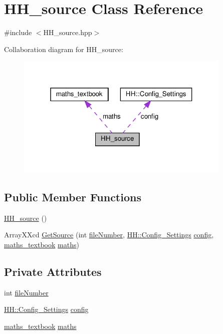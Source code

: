 \hypertarget{class_h_h__source}{}\section{H\+H\+\_\+source Class Reference}
\label{class_h_h__source}


{\ttfamily \#include $<$H\+H\+\_\+source.\+hpp$>$}



Collaboration diagram for H\+H\+\_\+source\+:\nopagebreak
\begin{figure}[H]
\begin{center}
\leavevmode
\includegraphics[width=292pt]{class_h_h__source__coll__graph}
\end{center}
\end{figure}
\subsection*{Public Member Functions}
\begin{DoxyCompactItemize}
\item 
\hyperlink{class_h_h__source_a0b3c052d274495b4f90fb09d15fff9fa}{H\+H\+\_\+source} ()
\item 
Array\+X\+Xcd \hyperlink{class_h_h__source_a059c934be1aaa0ed411fea5374bb2428}{Get\+Source} (int \hyperlink{class_h_h__source_a6631481cc1bea05ab564cb1841644a12}{file\+Number}, \hyperlink{class_h_h_1_1_config___settings}{H\+H\+::\+Config\+\_\+\+Settings} \hyperlink{class_h_h__source_adbab95c09c583e2aeebbb4679e6998e8}{config}, \hyperlink{classmaths__textbook}{maths\+\_\+textbook} \hyperlink{class_h_h__source_a93637ad30af846dd04eb741437114f8f}{maths})
\end{DoxyCompactItemize}
\subsection*{Private Attributes}
\begin{DoxyCompactItemize}
\item 
int \hyperlink{class_h_h__source_a6631481cc1bea05ab564cb1841644a12}{file\+Number}
\item 
\hyperlink{class_h_h_1_1_config___settings}{H\+H\+::\+Config\+\_\+\+Settings} \hyperlink{class_h_h__source_adbab95c09c583e2aeebbb4679e6998e8}{config}
\item 
\hyperlink{classmaths__textbook}{maths\+\_\+textbook} \hyperlink{class_h_h__source_a93637ad30af846dd04eb741437114f8f}{maths}
\end{DoxyCompactItemize}


